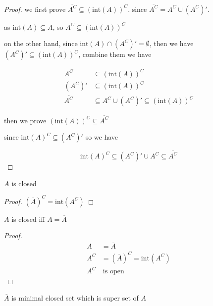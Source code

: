 \documentclass[11pt,a4paper]{article}
\begin{document}
\begin{proof}
    we first prove $\overline{A^C} \subseteq \left( \text{int}(A) \right)^C$. since $\overline{A^C} = A^C \cup \left(A^C\right)'$. 
    
    as $\text{int}(A) \subseteq A$, so $A^C \subseteq \left(\text{int}(A) \right)^C$
    
    on the other hand, since $\text{int}(A) \cap (A^C)' = \emptyset$, then we have $(A^C)' \subseteq (\text{int}(A))^C$, combine them 
    we have 

    \begin{align*}
        A^C &\subseteq \left(\text{int}(A) \right)^C \\
        (A^C)' & \subseteq \left(\text{int}(A) \right)^C \\
        \overline{A^C} &\subseteq A^C \cup (A^C)' \subseteq \left(\text{int}(A) \right)^C
    \end{align*}

    then we prove $(\text{int}(A))^C \subseteq \overline{A^C}$

    since $\text{int}(A)^C \subseteq (A^C)'$  so we have

    \[
        \text{int}(A)^C \subseteq (A^C)' \cup A^C \subseteq \overline{A^C}
    \]

\end{proof}


\begin{lem}
   $\overline{A}$ is closed 
\end{lem}

\begin{proof}
    $(\overline{A})^C = \text{int}(A^C)$
\end{proof}

\begin{lem}
    $A$ is closed iff $A = \overline{A}$
\end{lem}

\begin{proof}
    \begin{align*}
        A &= \overline{A} \\
        A^C &= (\overline{A})^C = \text{int}(A^C) \\
        A^C & \: \text{is open}
    \end{align*}
\end{proof}

\begin{lem}
    $\overline{A}$ is minimal closed set which is super set of $A$
\end{lem}
\end{document}
